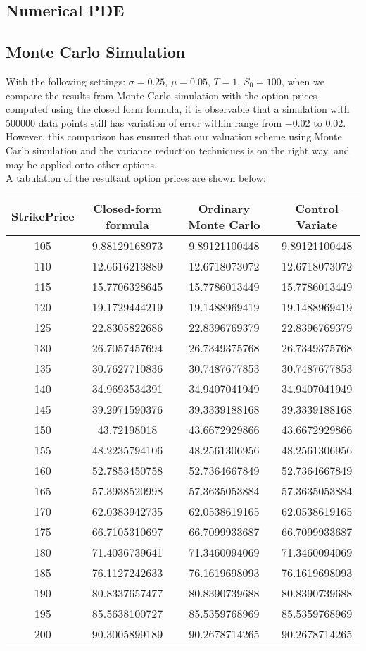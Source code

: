 \subsection{Numerical PDE}
\newpage
\subsection{Monte Carlo Simulation}
With the following settings: $\sigma = 0.25$, $\mu = 0.05$, $T = 1$, $S_{0} = 100$, 
when we compare the results from Monte Carlo simulation with the option prices computed using the closed form formula, it is observable that a simulation with 500000 data points still has variation of error within range from $-0.02$ to $0.02$. However, this comparison has ensured that our valuation scheme using Monte Carlo simulation and the variance reduction techniques is on the right way, and may be applied onto other options.\\
A tabulation of the resultant option prices are shown below:
\begin{center}
\begin{tabular}{|c|c|c|c|}
\hline
StrikePrice & Closed-form formula & Ordinary Monte Carlo & Control Variate\\
\hline
105&9.88129168973 &9.89121100448 & 9.89121100448 \\
110&12.6616213889 &12.6718073072 & 12.6718073072 \\
115&15.7706328645 &15.7786013449 & 15.7786013449 \\
120&19.1729444219 &19.1488969419 & 19.1488969419 \\
125&22.8305822686 &22.8396769379 & 22.8396769379 \\
130&26.7057457694 &26.7349375768 & 26.7349375768 \\
135&30.7627710836 &30.7487677853 & 30.7487677853 \\
140&34.9693534391 &34.9407041949 & 34.9407041949 \\
145&39.2971590376 &39.3339188168 & 39.3339188168 \\
150&43.72198018 &  43.6672929866 & 43.6672929866 \\
155&48.2235794106 &48.2561306956 & 48.2561306956 \\
160&52.7853450758 &52.7364667849 & 52.7364667849 \\
165&57.3938520998 &57.3635053884 & 57.3635053884 \\
170&62.0383942735 &62.0538619165 & 62.0538619165 \\
175&66.7105310697 &66.7099933687 & 66.7099933687 \\
180&71.4036739641 &71.3460094069 & 71.3460094069 \\
185&76.1127242633 &76.1619698093 & 76.1619698093 \\
190&80.8337657477 &80.8390739688 & 80.8390739688 \\
195&85.5638100727 &85.5359768969 & 85.5359768969 \\
200&90.3005899189 &90.2678714265 & 90.2678714265 \\
\hline
\end{tabular}
\end{center}
\newpage

